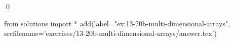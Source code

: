 
\begin{ex} 
  \label{ex:13-20b-multi-dimensional-arrays}
  
  \qed
\end{ex} 
\begin{python0}
from solutions import *
add(label="ex:13-20b-multi-dimensional-arrays",
    srcfilename='exercises/13-20b-multi-dimensional-arrays/answer.tex') 
\end{python0}
